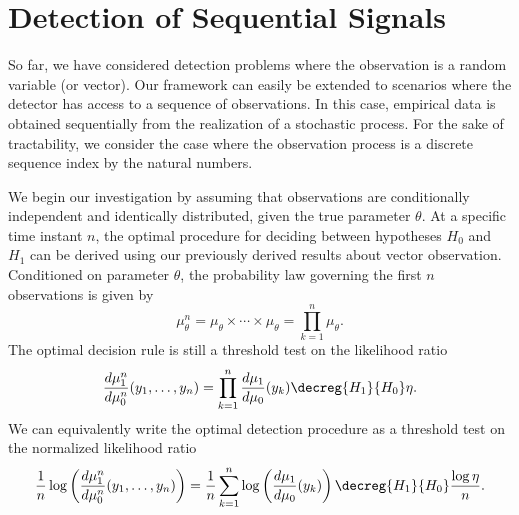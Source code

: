 \newpage

\section{Detection of Sequential Signals}

So far, we have considered detection problems where the observation is a random variable (or vector).
Our framework can easily be extended to scenarios where the detector has access to a sequence of observations.
In this case, empirical data is obtained sequentially from the realization of a stochastic process.
For the sake of tractability, we consider the case where the observation process is a discrete sequence index by the natural numbers.

We begin our investigation by assuming that observations are conditionally independent and identically distributed, given the true parameter $\theta$.
At a specific time instant $n$, the optimal procedure for deciding between hypotheses $H_0$ and $H_1$ can be derived using our previously derived results about vector observation.
Conditioned on parameter $\theta$, the probability law governing the first $n$ observations is given by
\begin{equation*}
\mu_{\theta}^n = \mu_{\theta} \times \cdots \times \mu_{\theta}
= \prod_{k=1}^n \mu_{\theta} .
\end{equation*}
The optimal decision rule is still a threshold test on the likelihood ratio
\begin{equation*}
\frac{d\mu_1^n}{d\mu_0^n} (y_1, \ldots, y_n)
= \prod_{k=1}^n \frac{d\mu_1}{d\mu_0}(y_k)
\decreg{H_1}{H_0} \eta .
\end{equation*}
We can equivalently write the optimal detection procedure as a threshold test on the normalized likelihood ratio
\begin{equation*}
\frac{1}{n} \log \left( \frac{d\mu_1^n}{d\mu_0^n} (y_1, \ldots, y_n) \right)
= \frac{1}{n} \sum_{k=1}^n \log \left( \frac{d\mu_1}{d\mu_0}(y_k) \right)
\decreg{H_1}{H_0} \frac{ \log \eta }{n} .
\end{equation*}


